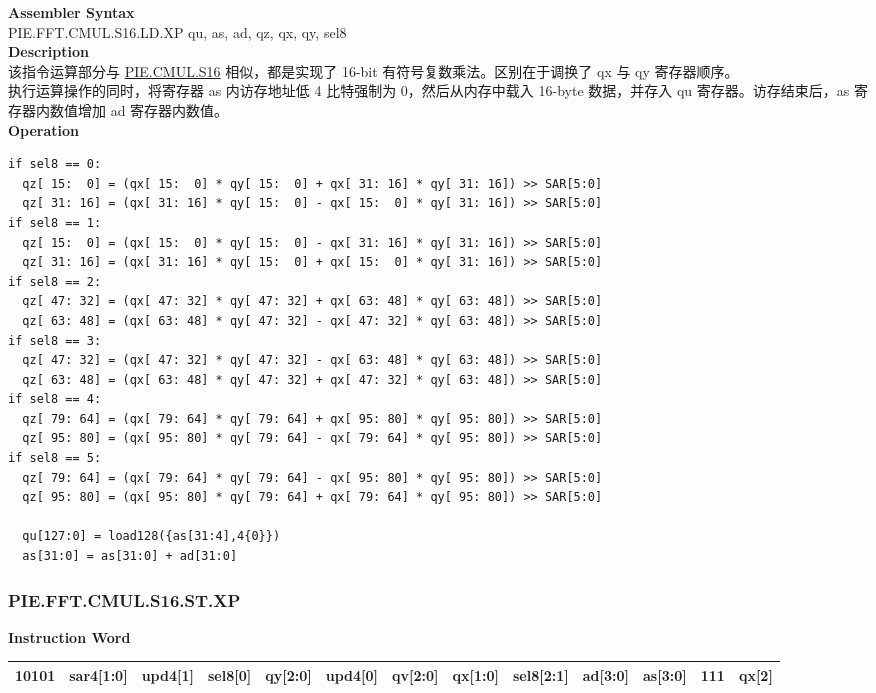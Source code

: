 \textbf{Assembler Syntax} \\
PIE.FFT.CMUL.S16.LD.XP qu, as, ad, qz, qx, qy, sel8 \\
\textbf{Description} \\
该指令运算部分与 \hyperref[instruction:PIECMULS16]{PIE.CMUL.S16} 相似，都是实现了 16-bit 有符号复数乘法。区别在于调换了 qx 与 qy 寄存器顺序。\\
执行运算操作的同时，将寄存器 as 内访存地址低 4 比特强制为 0，然后从内存中载入 16-byte 数据，并存入 qu 寄存器。访存结束后，as 寄存器内数值增加 ad 寄存器内数值。\\
\textbf{Operation}
\begin{lstlisting}
if sel8 == 0:
  qz[ 15:  0] = (qx[ 15:  0] * qy[ 15:  0] + qx[ 31: 16] * qy[ 31: 16]) >> SAR[5:0]
  qz[ 31: 16] = (qx[ 31: 16] * qy[ 15:  0] - qx[ 15:  0] * qy[ 31: 16]) >> SAR[5:0]
if sel8 == 1:
  qz[ 15:  0] = (qx[ 15:  0] * qy[ 15:  0] - qx[ 31: 16] * qy[ 31: 16]) >> SAR[5:0]
  qz[ 31: 16] = (qx[ 31: 16] * qy[ 15:  0] + qx[ 15:  0] * qy[ 31: 16]) >> SAR[5:0]
if sel8 == 2:
  qz[ 47: 32] = (qx[ 47: 32] * qy[ 47: 32] + qx[ 63: 48] * qy[ 63: 48]) >> SAR[5:0]
  qz[ 63: 48] = (qx[ 63: 48] * qy[ 47: 32] - qx[ 47: 32] * qy[ 63: 48]) >> SAR[5:0]
if sel8 == 3:
  qz[ 47: 32] = (qx[ 47: 32] * qy[ 47: 32] - qx[ 63: 48] * qy[ 63: 48]) >> SAR[5:0]
  qz[ 63: 48] = (qx[ 63: 48] * qy[ 47: 32] + qx[ 47: 32] * qy[ 63: 48]) >> SAR[5:0]
if sel8 == 4:
  qz[ 79: 64] = (qx[ 79: 64] * qy[ 79: 64] + qx[ 95: 80] * qy[ 95: 80]) >> SAR[5:0]
  qz[ 95: 80] = (qx[ 95: 80] * qy[ 79: 64] - qx[ 79: 64] * qy[ 95: 80]) >> SAR[5:0]
if sel8 == 5:
  qz[ 79: 64] = (qx[ 79: 64] * qy[ 79: 64] - qx[ 95: 80] * qy[ 95: 80]) >> SAR[5:0]
  qz[ 95: 80] = (qx[ 95: 80] * qy[ 79: 64] + qx[ 79: 64] * qy[ 95: 80]) >> SAR[5:0]

  qu[127:0] = load128({as[31:4],4{0}})
  as[31:0] = as[31:0] + ad[31:0]
\end{lstlisting}

\newpage
\subsubsection{PIE.FFT.CMUL.S16.ST.XP}\label{instruction:PIEFFTCMULS16STXP}
\setlength\tabcolsep{5pt}
\textbf{Instruction Word} \\
\begin{tabular}{|c|c|c|c|c|c|c|c|c|c|c|c|c|}
	\hline
	10101 & sar4[1:0] & upd4[1] & sel8[0] & qy[2:0] & upd4[0] & qv[2:0] & qx[1:0] & sel8[2:1] & ad[3:0] & as[3:0] & 111 & qx[2] \\
	\hline
\end{tabular}

